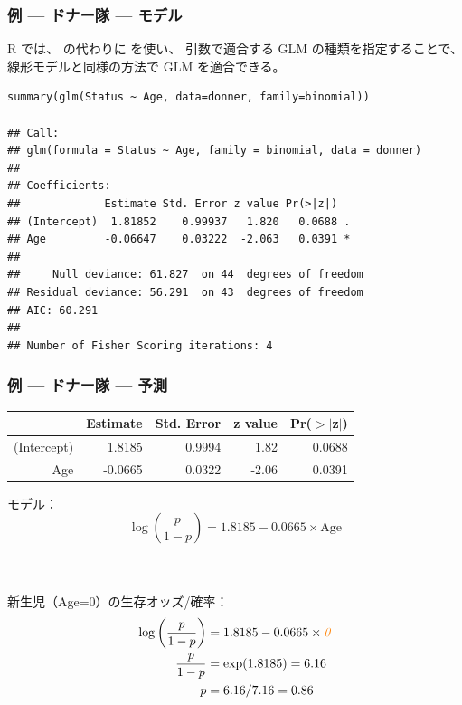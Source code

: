 \begin{frame}[fragile]
\frametitle{例 --- ドナー隊 --- モデル}
\vspace{-2mm}
R では、 の代わりに  を使い、 引数で適合する GLM の種類を指定することで、線形モデルと同様の方法で GLM を適合できる。\\

\vspace{2mm}

{\scriptsize
\begin{verbatim}
summary(glm(Status ~ Age, data=donner, family=binomial))

## Call:
## glm(formula = Status ~ Age, family = binomial, data = donner)
##
## Coefficients:
##             Estimate Std. Error z value Pr(>|z|)
## (Intercept)  1.81852    0.99937   1.820   0.0688 .
## Age         -0.06647    0.03222  -2.063   0.0391 *
##
##     Null deviance: 61.827  on 44  degrees of freedom
## Residual deviance: 56.291  on 43  degrees of freedom
## AIC: 60.291
##
## Number of Fisher Scoring iterations: 4
\end{verbatim}
}
\end{frame}



\begin{frame}
\frametitle{例 --- ドナー隊 --- 予測}

{\scriptsize
\begin{center}
\begin{tabular}{rrrrr}
  \hline
 & Estimate & Std. Error & z value & Pr($>$$|$z$|$) \\
  \hline
(Intercept) & 1.8185 & 0.9994 & 1.82 & 0.0688 \\
  Age & -0.0665 & 0.0322 & -2.06 & 0.0391 \\
   \hline
\end{tabular}
\end{center}
}

モデル：
\[\log\left(\frac{p}{1-p}\right) = 1.8185-0.0665\times \text{Age}\]

~\\~\\
新生児（Age=0）の生存オッズ/確率：
{\scriptsize
\begin{align*}
\log\left(\frac{p}{1-p}\right) &= 1.8185-0.0665\times \textit{\textcolor{orange}{0}}\\
\frac{p}{1-p} &= \exp(1.8185) = 6.16 \\
p &= 6.16/7.16 = 0.86
\end{align*}
}

\end{frame}

